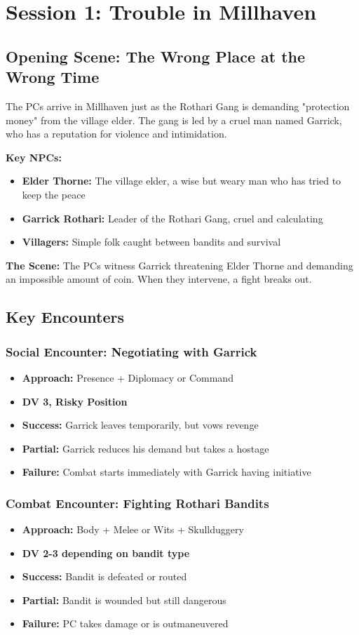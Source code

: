 \documentclass[11pt]{article}
\newenvironment{encounterbox}[1]{%
  \begin{mdframed}[backgroundcolor=encountercolor!30, linewidth=1pt, linecolor=accentcolor]%
  \subsubsection*{#1}%
}{%
  \end{mdframed}%
}
\begin{document}
\section{Session 1: Trouble in Millhaven}

\subsection{Opening Scene: The Wrong Place at the Wrong Time}

The PCs arrive in Millhaven just as the Rothari Gang is demanding "protection money" from the village elder. The gang is led by a cruel man named Garrick, who has a reputation for violence and intimidation.

\textbf{Key NPCs:}
\begin{itemize}
\item \textbf{Elder Thorne:} The village elder, a wise but weary man who has tried to keep the peace
\item \textbf{Garrick Rothari:} Leader of the Rothari Gang, cruel and calculating
\item \textbf{Villagers:} Simple folk caught between bandits and survival
\end{itemize}

\textbf{The Scene:} The PCs witness Garrick threatening Elder Thorne and demanding an impossible amount of coin. When they intervene, a fight breaks out.

\subsection{Key Encounters}

\begin{encounterbox}{Social Encounter: Negotiating with Garrick}
\begin{itemize}
\item \textbf{Approach:} Presence + Diplomacy or Command
\item \textbf{DV 3, Risky Position}
\item \textbf{Success:} Garrick leaves temporarily, but vows revenge
\item \textbf{Partial:} Garrick reduces his demand but takes a hostage
\item \textbf{Failure:} Combat starts immediately with Garrick having initiative
\end{itemize}
\end{encounterbox}

\begin{encounterbox}{Combat Encounter: Fighting Rothari Bandits}
\begin{itemize}
\item \textbf{Approach:} Body + Melee or Wits + Skullduggery
\item \textbf{DV 2-3 depending on bandit type}
\item \textbf{Success:} Bandit is defeated or routed
\item \textbf{Partial:} Bandit is wounded but still dangerous
\item \textbf{Failure:} PC takes damage or is outmaneuvered
\end{itemize}
\end{encounterbox}
\end{document}
